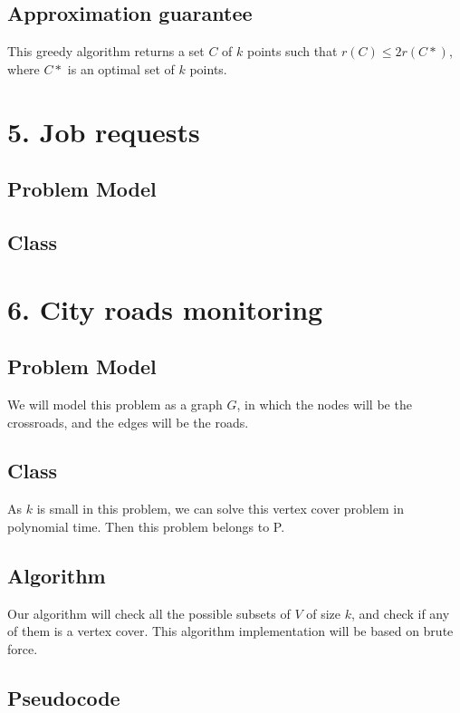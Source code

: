 \documentclass{article}
\begin{document}
\subsection*{Approximation guarantee}

This greedy algorithm returns a set $C$ of $k$ points such that $r(C)\leq 2r(C\ast)$, where $C\ast$ is an optimal set of $k$ points.

\section*{5. Job requests}

\subsection*{Problem Model}

\subsection*{Class}

\section*{6. City roads monitoring}

\subsection*{Problem Model}

We will model this problem as a graph $G$, in which the nodes will be the crossroads, and the edges will be the roads.

\subsection*{Class}

As $k$ is small in this problem, we can solve this vertex cover problem in polynomial time. Then this problem belongs to P.

\subsection*{Algorithm}

Our algorithm will check all the possible subsets of $V$ of size $k$, and check if any of them is a vertex cover. This algorithm implementation will be based on brute force.

\subsection*{Pseudocode}
\end{document}
